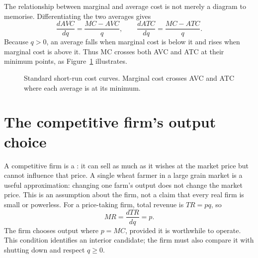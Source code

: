 The relationship between marginal and average cost is not merely a diagram
to memorise. Differentiating the two averages gives
\[
\frac{dAVC}{dq}=\frac{MC-AVC}{q},
\qquad
\frac{dATC}{dq}=\frac{MC-ATC}{q}.
\]
Because $q>0$, an average falls when marginal cost is below it and rises when
marginal cost is above it. Thus MC crosses both AVC and ATC at their minimum
points, as Figure~\ref{fig:standard-cost-curves} illustrates.

\begin{figure}[htbp]
  \centering
  \caption{Standard short-run cost curves. Marginal cost crosses AVC and ATC
  where each average is at its minimum.}
  \label{fig:standard-cost-curves}
\end{figure}
\FloatBarrier

\section{The competitive firm's output choice}

A competitive firm is a : it can sell as much as it
wishes at the market price but cannot influence that price. A single wheat
farmer in a large grain market is a useful approximation: changing one farm's
output does not change the market price. This is an assumption about the firm,
not a claim that every real firm is small or powerless. For a price-taking
firm, total revenue is $TR=pq$, so
\[
MR=\frac{dTR}{dq}=p.
\]
The firm chooses output where $p=MC$, provided it is worthwhile to operate.
This condition identifies an interior candidate; the firm must also compare
it with shutting down and respect $q\geq0$.

